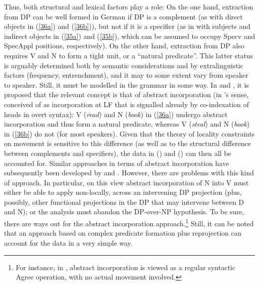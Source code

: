\documentclass[output=paper
,modfonts
,nonflat]{langsci/langscibook}
\begin{document}
	\ea\label{ex:mueller:38}
	\z
	\z
	Thus, both structural and lexical factors play a role: On the one
	hand, extraction from DP can be well formed in German if DP is a complement
	(as with direct objects in (\ref{36a}) and (\ref{36b})), but not if it is a specifier (as in
	with subjects and indirect objects in (\ref{35a}) and (\ref{35b}), which can be assumed
	to occupy Specv and SpecAppl positions, respectively). On the other
	hand, extraction from DP also requires V and N to form a tight unit,
	or a ``natural predicate''. This latter status is arguably determined
	both by semantic considerations and by extralinguistic factors
	(frequency, entrenchment), and it may to some extent vary from speaker
	to speaker. Still, it must be modelled in the grammar in some way. In
	\citet{Mueller:91:abs} and \citet{MuellerSternefeld:95}, it is proposed
	that the relevant concept is that of abstract incorporation (in
	\citealt{Baker:88}'s sense, conceived of as incorporation at LF that
	is signalled already by co-indexation of heads in overt syntax): V
	(\textit{read}) and N (\textit{book}) in (\ref{36a}) undergo abstract
	incorporation and thus form a natural predicate, whereas V (\textit{steal}) 
	and N (\textit{book}) in (\ref{36b}) do not (for most speakers). Given that
	the theory of locality constraints on movement is sensitive to this
	difference (as well as to the structural difference between
	complements and specifiers), the data in (\LLast) and (\Last) can then all
	be accounted for. Similar approaches in terms of abstract
	incorporation have subsequently been developed by
	\citet{DaviesDubinsky:03} and \citet{Schmellentin:06}. However, there
	are problems with this kind of approach. In particular, on this view
	abstract incorporation of N into V must either be able to apply
	non-locally, across an intervening DP projection (plus, possibly,
	other functional projections in the DP that may intervene between D
	and N); or the analysis must abandon the DP-over-NP hypothesis. To be
	sure, there are ways out for the abstract incorporation
	approach.\footnote{For instance, in \citet{Mueller:11:loc}, abstract incorporation is
		viewed as a regular syntactic Agree operation, with no actual
		movement involved.} Still, it can be noted that an approach based on
	complex predicate formation plus reprojection can account for the data
	in a very simple way. 
	
\end{document}
